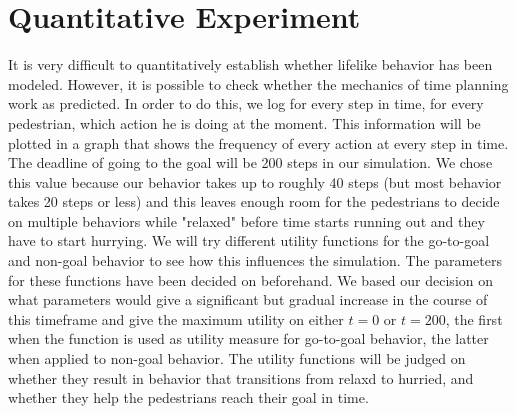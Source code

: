 \documentclass[11pt]{book}
\begin{document}




\section{Quantitative Experiment}
It is very difficult to quantitatively establish whether lifelike behavior has been modeled. However, it is possible to check whether the mechanics of time planning work as predicted. In order to do this, we log for every step in time, for every pedestrian, which action he is doing at the moment. This information will be plotted in a graph that shows the frequency of every action at every step in time. The deadline of going to the goal will be 200 steps in our simulation. We chose this value because our behavior takes up to roughly 40 steps (but most behavior takes 20 steps or less) and this leaves enough room for the pedestrians to decide on multiple behaviors while "relaxed" before time starts running out and they have to start hurrying.
We will try different utility functions for the go-to-goal and non-goal behavior to see how this influences the simulation. The parameters for these functions have been decided on beforehand. We based our decision on what parameters would give a significant but gradual increase in the course of this timeframe and give the maximum utility on either $t=0$ or $t=200$, the first when the function is used as utility measure for go-to-goal behavior, the latter when applied to non-goal behavior. The utility functions will be judged on whether they result in behavior that transitions from relaxd to hurried, and whether they help the pedestrians reach their goal in time.
\end{document}
